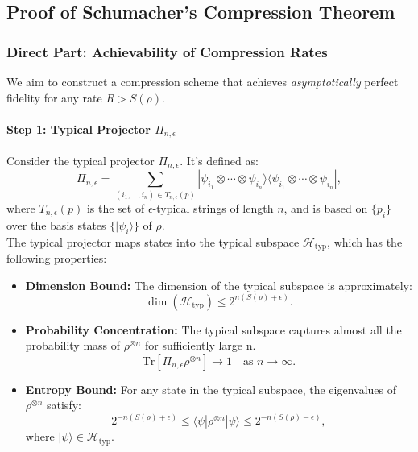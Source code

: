 \subsection{Proof of Schumacher's Compression Theorem}

\subsubsection{Direct Part: Achievability of Compression Rates}

We aim to construct a compression scheme that achieves \textit{asymptotically} perfect fidelity for any rate \(R > S(\rho)\).

\paragraph{Step 1: Typical Projector \(\Pi_{n, \epsilon}\)}

Consider the typical projector \(\Pi_{n, \epsilon}\). It's defined as:
\[
\Pi_{n, \epsilon} = \sum_{(i_1, \dots, i_n) \in T_{n, \epsilon}(p)} |\psi_{i_1} \otimes \cdots \otimes \psi_{i_n}\rangle \langle \psi_{i_1} \otimes \cdots \otimes \psi_{i_n}|,
\]
where \(T_{n, \epsilon}(p)\) is the set of \(\epsilon\)-typical strings of length \(n\), and is based on \(\{p_i\}\) over the basis states \(\{|\psi_i\rangle\}\) of \(\rho\). 
\\
The typical projector maps states into the typical subspace \(\mathcal{H}_{\text{typ}}\), which has the following properties:

\begin{itemize}
    \item \textbf{Dimension Bound:}
    The dimension of the typical subspace is approximately:
    \[
    \dim(\mathcal{H}_{\text{typ}}) \leq 2^{n(S(\rho) + \epsilon)}.
    \]

    \item \textbf{Probability Concentration:}
    The typical subspace captures almost all the probability mass of \(\rho^{\otimes n}\) for sufficiently large n.
    \[
    \text{Tr}[\Pi_{n, \epsilon} \rho^{\otimes n}] \to 1 \quad \text{as } n \to \infty.
    \]

    \item \textbf{Entropy Bound:}
    For any state in the typical subspace, the eigenvalues of \(\rho^{\otimes n}\) satisfy:
    \[
    2^{-n(S(\rho) + \epsilon)} \leq \langle \psi | \rho^{\otimes n} | \psi \rangle \leq 2^{-n(S(\rho) - \epsilon)},
    \]
    where \(|\psi\rangle \in \mathcal{H}_{\text{typ}}\).
\end{itemize}

